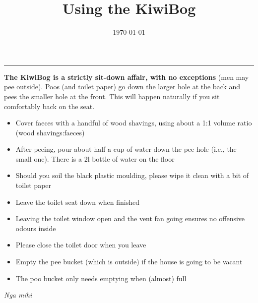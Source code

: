 \documentclass[12pt]{article} %
\title{Using the KiwiBog}
\date{\today} %
\makeatletter
\renewcommand{\maketitle}{%
  \begin{center}
    {\bfseries{\scshape{\Large{\@title\par}}}}
  \end{center}
  \medskip
  \begin{flushright}
    {\@date\par}
  \end{flushright}
    \bigskip\hrule\vspace*{2pc}%
}
\makeatother
\begin{document}
\maketitle

\bigskip

\textbf{The KiwiBog is a strictly sit-down affair, with no exceptions} (men may pee outside).  Poos (and toilet paper) go down the larger hole at the back and pees the smaller hole at the front.  This will happen naturally if you sit comfortably back on the seat.

\bigskip

\begin{itemize}
 \item Cover faeces with a handful of wood shavings, using about a 1:1 volume ratio (wood shavings:faeces)
 \item After peeing, pour about half a cup of water down the pee hole (i.e., the small one).  There is a 2l bottle of water on the floor
 \item Should you soil the black plastic moulding, please wipe it clean with a bit of toilet paper
 \item Leave the toilet seat down when finished
 \item Leaving the toilet window open and the vent fan going ensures no offensive odours inside
 \item Please close the toilet door when you leave
 \item Empty the pee bucket (which is outside) if the house is going to be vacant
 \item The poo bucket only needs emptying when (almost) full
\end{itemize}

\bigskip

\textit{Nga mihi}
\end{document}
